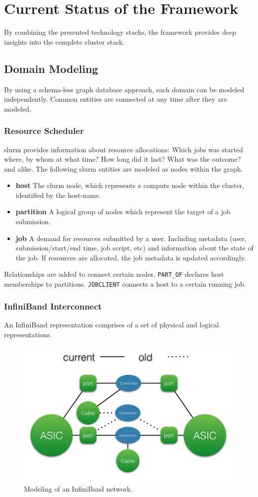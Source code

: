 \section{Current Status of the Framework}
By combining the presented technology stacks, the framework provides deep insights into the complete cluster stack.

\subsection{Domain Modeling}
By using a schema-less graph database approach, each domain can be modeled independently. Common entities are connected at any time after
they are modeled.

\subsubsection{Resource Scheduler}
\gls{slurm} provides information about resource allocations: Which jobs was started where, by whom at what time? How long did it last? What was the outcome? and alike.
The following \gls{slurm} entities are modeled as nodes within the graph.
\begin{itemize}
    \item \textbf{host} The \gls{slurm} node, which represents a compute node within the cluster, identified by the host-name.
    \item \textbf{partition} A logical group of nodes which represent the target of a job submission.
    \item \textbf{job} A demand for resources submitted by a user. Including metadata (user, submission/start/end time, job script, etc) and information about the state of the job. If resources are allocated, the job metadata is updated accordingly.
\end{itemize}
Relationships are added to connect certain nodes. \lstinline{PART_OF} declares host memberships to partitions. \lstinline{JOBCLIENT} connects a host to a certain running job.

\subsubsection{InfiniBand Interconnect}
An InfiniBand representation comprises of a set of physical and logical representations.
\begin{figure}[!ht]
    \includegraphics[width=.4\textwidth]{images/png/infiniband_graph.png}
    \caption{\label{fig:ib_graph}Modeling of an InfiniBand network.}
\end{figure}

